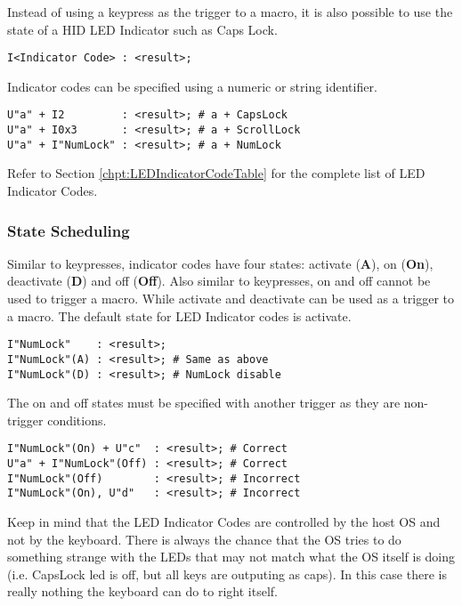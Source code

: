\documentclass{kiibohd-template}
\begin{document}
Instead of using a keypress as the trigger to a macro, it is also possible to use the state of a HID LED Indicator such as Caps Lock.

\begin{lstlisting}
I<Indicator Code> : <result>;
\end{lstlisting}

Indicator codes can be specified using a numeric or string identifier.

\begin{lstlisting}
U"a" + I2         : <result>; # a + CapsLock
U"a" + I0x3       : <result>; # a + ScrollLock
U"a" + I"NumLock" : <result>; # a + NumLock
\end{lstlisting}

Refer to Section \ref{chpt:LEDIndicatorCodeTable} for the complete list of LED Indicator Codes.


\subsubsection{State Scheduling}

Similar to keypresses, indicator codes have four states: activate (\textbf{A}), on (\textbf{On}), deactivate (\textbf{D}) and off (\textbf{Off}).
Also similar to keypresses, on and off cannot be used to trigger a macro.
While activate and deactivate can be used as a trigger to a macro.
The default state for LED Indicator codes is activate.

\begin{lstlisting}
I"NumLock"    : <result>;
I"NumLock"(A) : <result>; # Same as above
I"NumLock"(D) : <result>; # NumLock disable
\end{lstlisting}

The on and off states must be specified with another trigger as they are non-trigger conditions.

\begin{lstlisting}
I"NumLock"(On) + U"c"  : <result>; # Correct
U"a" + I"NumLock"(Off) : <result>; # Correct
I"NumLock"(Off)        : <result>; # Incorrect
I"NumLock"(On), U"d"   : <result>; # Incorrect
\end{lstlisting}

Keep in mind that the LED Indicator Codes are controlled by the host OS and not by the keyboard.
There is always the chance that the OS tries to do something strange with the LEDs that may not match what the OS itself is doing (i.e. CapsLock led is off, but all keys are outputing as caps).
In this case there is really nothing the keyboard can do to right itself.
\end{document}
